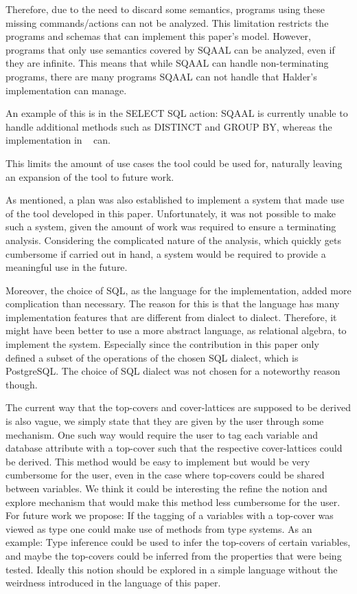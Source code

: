 Therefore, due to the need to discard some semantics, programs using these missing commands/actions can not be analyzed.
This limitation restricts the programs and schemas that can implement this paper's model.
However, programs that only use semantics covered by SQAAL can be analyzed, even if they are infinite.
This means that while SQAAL can handle non-terminating programs, there are many programs SQAAL can not handle that Halder's implementation can manage.

An example of this is in the SELECT SQL action: SQAAL is currently unable to handle additional methods such as DISTINCT and GROUP BY, whereas the implementation in ~\cite{halder_abstract_2012} can.

This limits the amount of use cases the tool could be used for, naturally leaving an expansion of the tool to future work.

As mentioned, a plan was also established to implement a system that made use of the tool developed in this paper.
Unfortunately, it was not possible to make such a system, given the amount of work was required to ensure a terminating analysis.
Considering the complicated nature of the analysis, which quickly gets cumbersome if carried out in hand, a system would be required to provide a meaningful use in the future.


Moreover, the choice of SQL, as the language for the implementation, added more complication than necessary.
The reason for this is that the language has many implementation features that are different from dialect to dialect.
Therefore, it might have been better to use a more abstract language, as relational algebra, to implement the system.
Especially since the contribution in this paper only defined a subset of the operations of the chosen SQL dialect, which is PostgreSQL.
The choice of SQL dialect was not chosen for a noteworthy reason though.


The current way that the top-covers and cover-lattices are supposed to be derived is also vague, we simply state that they are given by the user through some mechanism.
One such way would require the user to tag each variable and database attribute with a top-cover such that the respective cover-lattices could be derived.
This method would be easy to implement but would be very cumbersome for the user, even in the case where top-covers could be shared between variables.
We think it could be interesting the refine the notion and explore mechanism that would make this method less cumbersome for the user.
For future work we propose:
If the tagging of a variables with a top-cover was viewed as type one could make use of methods from type systems.
As an example: Type inference could be used to infer the top-covers of certain variables, and maybe the top-covers could be inferred from the properties that were being tested.
Ideally this notion should be explored in a simple language without the weirdness introduced in the language of this paper.


